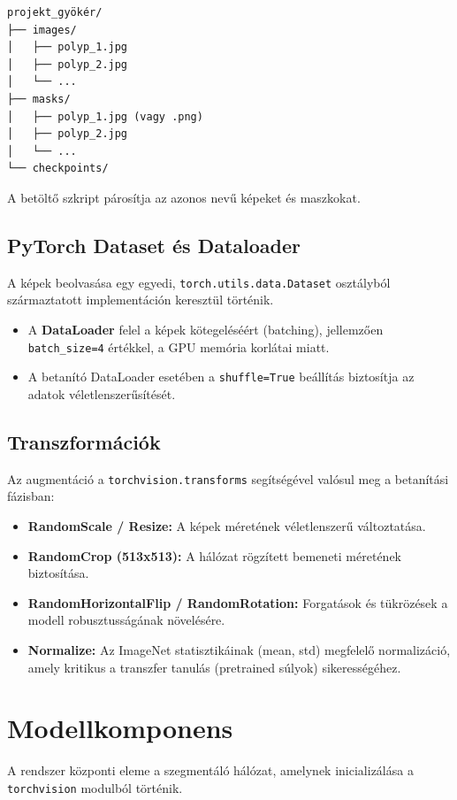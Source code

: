 \documentclass[12pt, a4paper]{report}
\begin{document}
\begin{verbatim}
projekt_gyökér/
├── images/
│   ├── polyp_1.jpg
│   ├── polyp_2.jpg
│   └── ...
├── masks/
│   ├── polyp_1.jpg (vagy .png)
│   ├── polyp_2.jpg
│   └── ...
└── checkpoints/
\end{verbatim}
A betöltő szkript párosítja az azonos nevű képeket és maszkokat.

\subsection{PyTorch Dataset és Dataloader}
A képek beolvasása egy egyedi, \texttt{torch.utils.data.Dataset} osztályból származtatott implementáción keresztül történik. 
\begin{itemize}
    \item A \textbf{DataLoader} felel a képek kötegeléséért (batching), jellemzően \texttt{batch\_size=4} értékkel, a GPU memória korlátai miatt.
    \item A betanító DataLoader esetében a \texttt{shuffle=True} beállítás biztosítja az adatok véletlenszerűsítését.
\end{itemize}

\subsection{Transzformációk}
Az augmentáció a \texttt{torchvision.transforms} segítségével valósul meg a betanítási fázisban:
\begin{itemize}
    \item \textbf{RandomScale / Resize:} A képek méretének véletlenszerű változtatása.
    \item \textbf{RandomCrop (513x513):} A hálózat rögzített bemeneti méretének biztosítása.
    \item \textbf{RandomHorizontalFlip / RandomRotation:} Forgatások és tükrözések a modell robusztusságának növelésére.
    \item \textbf{Normalize:} Az ImageNet statisztikáinak (mean, std) megfelelő normalizáció, amely kritikus a transzfer tanulás (pretrained súlyok) sikerességéhez.
\end{itemize}

\section{Modellkomponens}

A rendszer központi eleme a szegmentáló hálózat, amelynek inicializálása a \texttt{torchvision} modulból történik.
\end{document}
